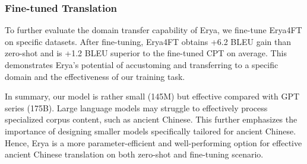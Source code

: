 
\subsubsection{Fine-tuned Translation}
To further evaluate the domain transfer capability of Erya, we fine-tune Erya4FT on specific datasets. 
After fine-tuning, Erya4FT obtains +6.2 BLEU gain than zero-shot and is +1.2 BLEU superior to the fine-tuned CPT on average. This demonstrates Erya's potential of accustoming and transferring to a specific domain and the effectiveness of our training task. %

In summary, our model is rather small (145M) but effective compared with GPT series (175B). Large language models may struggle to effectively process specialized corpus content, such as ancient Chinese. This further emphasizes the importance of designing smaller models specifically tailored for ancient Chinese.
Hence, Erya is a more parameter-efficient and well-performing option for effective ancient Chinese translation on both zero-shot and fine-tuning scenario. 





